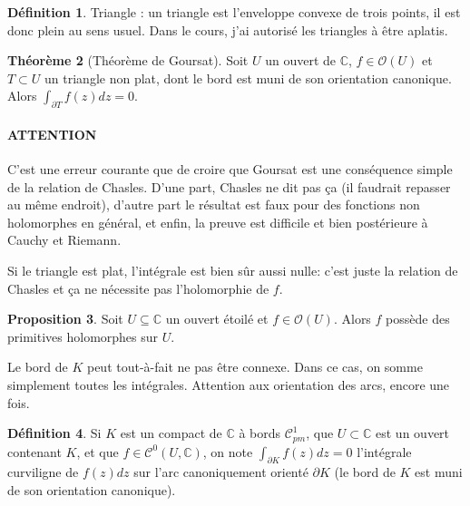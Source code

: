 \documentclass[11pt,a4paper]{article}
\newcommand{\C}{\mathbb{C}}
\theoremstyle{definition}
\newtheorem{theoreme}{Th\'eor\`eme}[section]
\newtheorem{proposition}[theoreme]{Proposition}
\newtheorem{definition}[theoreme]{D\'efinition}
\theoremstyle{plain}
\begin{document}
\begin{definition}
Triangle : un triangle est l'enveloppe convexe de trois points, il est donc \og plein\fg{} au sens usuel. Dans le cours, j'ai autorisé les triangles à être aplatis.
\end{definition}

\begin{theoreme}[Théorème de Goursat]
Soit $U$ un ouvert de $\C$,  $f\in \mathcal O(U)$ et $T\subset U$ un triangle non plat, dont le bord est muni de son orientation canonique.
Alors $\int_{\partial T} f(z)dz=0$.
\end{theoreme}

\paragraph{ATTENTION} C'est une erreur courante que de croire que Goursat est une conséquence simple de la relation de Chasles. D'une part, Chasles ne dit pas ça (il faudrait \og repasser au même endroit\fg), d'autre part le résultat est faux pour des fonctions non holomorphes en général, et enfin, la preuve est difficile et bien postérieure à Cauchy et Riemann.

\begin{remarque}
Si le triangle est plat, l'intégrale est bien sûr aussi nulle: c'est juste la relation de Chasles et ça ne nécessite pas l'holomorphie de $f$.
\end{remarque}

\begin{proposition}
Soit $U\subseteq \C$ un ouvert étoilé et $f\in \mathcal O(U)$.
Alors $f$ possède des primitives holomorphes sur $U$.
\end{proposition}

\begin{remarque}
Le bord de $K$ peut tout-à-fait ne pas être connexe. Dans ce cas, on somme simplement toutes les intégrales. Attention aux orientation des arcs, encore une fois.
\end{remarque}
\begin{definition}
Si $K$ est un compact de $\C$ à bords $\mathcal C^1_{pm}$, que $U\subset \C$ est un ouvert contenant $K$, et que $f\in \mathcal C^0(U,\C)$, on note $\int_{\partial K} f(z)dz = 0$ l'intégrale curviligne de $f(z)dz$ sur l'arc canoniquement orienté $\partial K$ (le bord de $K$ est muni de son orientation canonique).
\end{definition}
\end{document}
